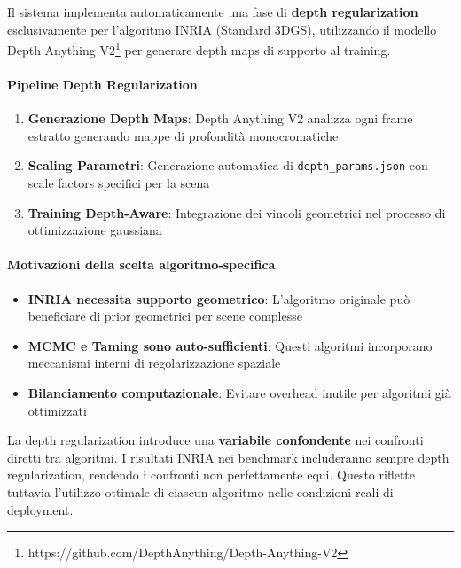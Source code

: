 \label{subsubsec:depth_regularization}

Il sistema implementa automaticamente una fase di \textbf{depth regularization} esclusivamente per l'algoritmo INRIA (Standard 3DGS), utilizzando il modello Depth Anything V2\footnote{https://github.com/DepthAnything/Depth-Anything-V2} per generare depth maps di supporto al training.

\paragraph{Pipeline Depth Regularization}
\begin{enumerate}
	\item \textbf{Generazione Depth Maps}: Depth Anything V2 analizza ogni frame estratto generando mappe di profondità monocromatiche
	\item \textbf{Scaling Parametri}: Generazione automatica di \texttt{depth\_params.json} con scale factors specifici per la scena
	\item \textbf{Training Depth-Aware}: Integrazione dei vincoli geometrici nel processo di ottimizzazione gaussiana
\end{enumerate}


\paragraph{Motivazioni della scelta algoritmo-specifica}
\begin{itemize}
	\item \textbf{INRIA necessita supporto geometrico}: L'algoritmo originale può beneficiare di prior geometrici per scene complesse
	\item \textbf{MCMC e Taming sono auto-sufficienti}: Questi algoritmi incorporano meccanismi interni di regolarizzazione spaziale
	\item \textbf{Bilanciamento computazionale}: Evitare overhead inutile per algoritmi già ottimizzati
\end{itemize}

\begin{tcolorbox}[colback=orange!10,colframe=orange!50,title=Importante: Variabile Confondente nei Confronti]
	La depth regularization introduce una \textbf{variabile confondente} nei confronti diretti tra algoritmi. I risultati INRIA nei benchmark includeranno sempre depth regularization, rendendo i confronti non perfettamente equi. Questo riflette tuttavia l'utilizzo ottimale di ciascun algoritmo nelle condizioni reali di deployment.
\end{tcolorbox}

